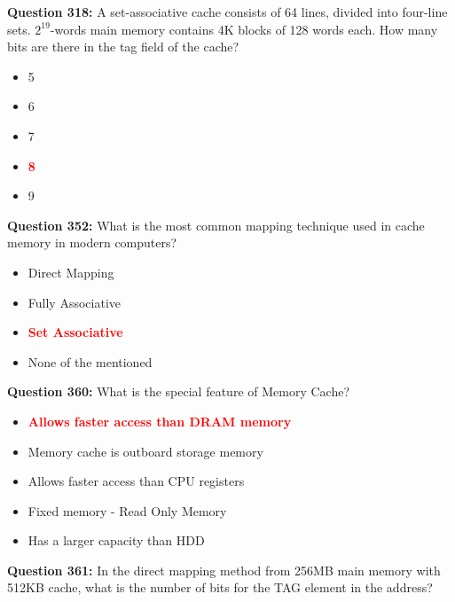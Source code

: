 \documentclass[12pt,a4paper]{article}
\begin{document}
\vspace{0.5cm}

\textbf{Question 318:} A set-associative cache consists of 64 lines, divided into four-line sets. $2^{19}$-words main memory contains 4K blocks of 128 words each. How many bits are there in the tag field of the cache?

\begin{itemize}
    \item[\textbf{A.}] 5
    \item[\textbf{B.}] 6
    \item[\textbf{C.}] 7
    \item[\textbf{D.}] \textcolor{red}{\textbf{8}}
    \item[\textbf{E.}] 9
\end{itemize}

\vspace{0.5cm}

\textbf{Question 352:} What is the most common mapping technique used in cache memory in modern computers?

\begin{itemize}
    \item[\textbf{A.}] Direct Mapping
    \item[\textbf{B.}] Fully Associative
    \item[\textbf{C.}] \textcolor{red}{\textbf{Set Associative}}
    \item[\textbf{D.}] None of the mentioned
\end{itemize}

\vspace{0.5cm}

\textbf{Question 360:} What is the special feature of Memory Cache?

\begin{itemize}
    \item[\textbf{A.}] \textcolor{red}{\textbf{Allows faster access than DRAM memory}}
    \item[\textbf{B.}] Memory cache is outboard storage memory
    \item[\textbf{C.}] Allows faster access than CPU registers
    \item[\textbf{D.}] Fixed memory - Read Only Memory
    \item[\textbf{E.}] Has a larger capacity than HDD
\end{itemize}

\vspace{0.5cm}

\textbf{Question 361:} In the direct mapping method from 256MB main memory with 512KB cache, what is the number of bits for the TAG element in the address?
\end{document}
